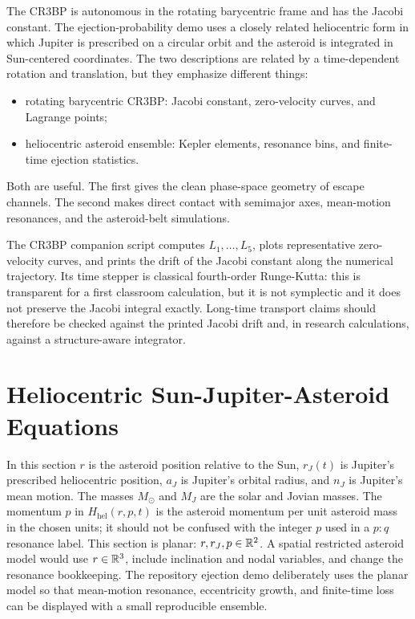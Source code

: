The CR3BP is autonomous in the rotating barycentric frame and has the Jacobi
constant. The ejection-probability demo uses a closely related heliocentric
form in which Jupiter is prescribed on a circular orbit and the asteroid is
integrated in Sun-centered coordinates. The two descriptions are related by a
time-dependent rotation and translation, but they emphasize different things:
\begin{itemize}
\item rotating barycentric CR3BP: Jacobi constant, zero-velocity curves, and
Lagrange points;
\item heliocentric asteroid ensemble: Kepler elements, resonance bins, and
finite-time ejection statistics.
\end{itemize}
Both are useful. The first gives the clean phase-space geometry of escape
channels. The second makes direct contact with semimajor axes, mean-motion
resonances, and the asteroid-belt simulations.

The CR3BP companion script computes \(L_1,\ldots,L_5\), plots representative
zero-velocity curves, and prints the drift of the Jacobi constant along the
numerical trajectory. Its time stepper is classical fourth-order Runge-Kutta:
this is transparent for a first classroom calculation, but it is not
symplectic and it does not preserve the Jacobi integral exactly. Long-time
transport claims should therefore be checked against the printed Jacobi drift
and, in research calculations, against a structure-aware integrator.

\section{Heliocentric Sun-Jupiter-Asteroid Equations}
\label{sec:restricted-sun-jupiter-asteroid}

In this section \(r\) is the asteroid position relative to the Sun, \(r_J(t)\)
is Jupiter's prescribed heliocentric position, \(a_J\) is Jupiter's orbital
radius, and \(n_J\) is Jupiter's mean motion.  The masses \(M_\odot\) and
\(M_J\) are the solar and Jovian masses.  The momentum \(p\) in
\(H_{\mathrm{hel}}(r,p,t)\) is the asteroid momentum per unit asteroid mass in
the chosen units; it should not be confused with the integer \(p\) used in a
\(p:q\) resonance label.
This section is planar: \(r,r_J,p\in\mathbb{R}^2\).  A spatial restricted asteroid
model would use \(r\in\mathbb{R}^3\), include inclination and nodal variables, and
change the resonance bookkeeping.  The repository ejection demo deliberately
uses the planar model so that mean-motion resonance, eccentricity growth, and
finite-time loss can be displayed with a small reproducible ensemble.

